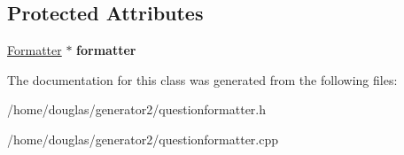 \subsection*{Protected Attributes}
\begin{DoxyCompactItemize}
\item 
\hyperlink{classFormatter}{Formatter} $\ast$ {\bfseries formatter}\hypertarget{classQuestionFormatter_a87b39e5c6907234f40e418bee3031051}{}\label{classQuestionFormatter_a87b39e5c6907234f40e418bee3031051}

\end{DoxyCompactItemize}


The documentation for this class was generated from the following files\+:\begin{DoxyCompactItemize}
\item 
/home/douglas/generator2/questionformatter.\+h\item 
/home/douglas/generator2/questionformatter.\+cpp\end{DoxyCompactItemize}
